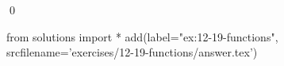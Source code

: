 
\begin{ex}
  \label{ex:12-19-functions}
  
  \qed
\end{ex}
\begin{python0}
from solutions import *
add(label="ex:12-19-functions",
    srcfilename='exercises/12-19-functions/answer.tex')
\end{python0}
